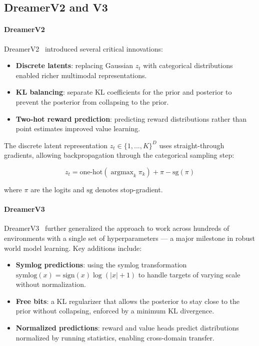 \documentclass{tufte-handout}
\DeclareMathOperator*{\argmax}{argmax}
\begin{document}
\subsection{DreamerV2 and V3}

\paragraph{DreamerV2}
DreamerV2~\nocite{hafner2021} introduced several critical innovations:
\begin{itemize}
    \item \textbf{Discrete latents}: replacing Gaussian $z_t$ with categorical distributions
          enabled richer multimodal representations.
    \item \textbf{KL balancing}: separate KL coefficients for the prior and posterior to
          prevent the posterior from collapsing to the prior.
    \item \textbf{Two-hot reward prediction}: predicting reward distributions rather than
          point estimates improved value learning.
\end{itemize}

The discrete latent representation $z_t \in \{1, ..., K\}^D$ uses straight-through gradients,
allowing backpropagation through the categorical sampling step:

\begin{equation}
    z_t = \text{one-hot}\left(\argmax_k \pi_k\right) + \pi - \text{sg}(\pi)
\end{equation}

where $\pi$ are the logits and $\text{sg}$ denotes stop-gradient.

\paragraph{DreamerV3}
DreamerV3~\nocite{hafner2023} further generalized the approach to work across hundreds of environments with a
single set of hyperparameters --- a major milestone in robust world model learning. Key
additions include:

\begin{itemize}
    \item \textbf{Symlog predictions}: using the symlog transformation
          $\text{symlog}(x) = \text{sign}(x)\log(|x|+1)$ to handle targets of varying scale
          without normalization.
    \item \textbf{Free bits}: a KL regularizer that allows the posterior to stay close to the
          prior without collapsing, enforced by a minimum KL divergence.
    \item \textbf{Normalized predictions}: reward and value heads predict distributions
          normalized by running statistics, enabling cross-domain transfer.
\end{itemize}
\end{document}
